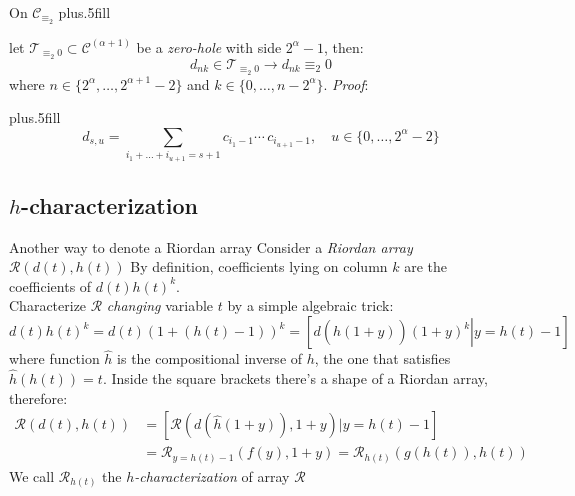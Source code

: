 \documentclass[10pt,serif, professionalfont]{beamer}
\begin{document}
\begin{frame}{On $\mathcal{C}_{\equiv_{2}}$}
      \vskip-20pt plus.5fill
    \begin{theorem}
    let $\mathcal{T}_{\equiv_{2}0} \subset \mathcal{C}^{(\alpha+1)}$ be a %
    \emph{zero-hole} with side $2^{\alpha}-1$, then:
    \begin{displaymath}
        d_{nk}\in\mathcal{T}_{\equiv_{2}0}\rightarrow d_{nk}\equiv_{2}0
    \end{displaymath}
    where $n\in\lbrace2^{\alpha},\ldots,2^{\alpha+1}-2\rbrace$ and $k\in\lbrace0,\ldots,n-2^{\alpha}\rbrace$. \emph{Proof}: 
    \end{theorem}
      \vskip-10pt plus.5fill
    \begin{displaymath}
        d_{s, u} = \sum_{i_{1}+\ldots+i_{u+1}=s+1}
            {c_{i_{1}-1}\cdots\,c_{i_{u+1}-1}}, \quad u\in\lbrace0,\ldots,2^{\alpha}-2\rbrace
    \end{displaymath}

    
        
\end{frame}

\subsection{$h$-characterization}

\begin{frame}{Another way to denote a Riordan array}
    Consider a \emph{Riordan array} $\mathcal{R}\left(d(t),h(t)\right)$ 
    By definition, coefficients lying on 
    column $k$ are the coefficients of $d(t)h(t)^k$.\\
    \pause
    Characterize $\mathcal{R}$ \emph{changing} variable $t$ by a simple
    algebraic trick:
    \begin{displaymath}
        d(t)h(t)^k = d(t)(1 + (h(t)-1))^k = \left[ \left. d(\hat{h}(1+y))(1+y)^k \right|y = h(t)-1  \right]
    \end{displaymath}
    where function $\hat{h}$ is the compositional inverse of $h$, the one that
    satisfies $\hat{h}(h(t)) = t$.
    \pause
    Inside the square brackets there's a shape of a Riordan array, therefore:
    \begin{displaymath}
        \begin{split}
            \mathcal{R}\left(d(t),h(t)\right) &= \left[ \mathcal{R}\left(d(\hat{h}(1+y)), 1+y\right) \left| y = h(t)-1 \right. \right]\\
            &= \mathcal{R}_{y=h(t)-1}\left( f(y), 1+y \right) =  \mathcal{R}_{h(t)}\left( g(h(t)), h(t) \right) 
        \end{split}
    \end{displaymath}
    We call $\mathcal{R}_{h(t)}$ the \emph{$h$-characterization} of array $\mathcal{R}$ 
\end{frame}
\end{document}
